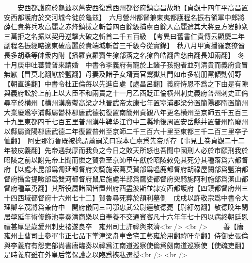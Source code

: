 　　安西都護府於龜兹以舊安西復爲西州都督府鎮高昌故地【貞觀十四年平高昌置安西都護府於交河城今徙於龜兹】　六月營州都督兼東夷都護程名振右領軍中郎將薛仁貴將兵攻高麗之赤烽鎮拔之斬首四百餘級捕虜百餘人高麗遣其大將豆方婁帥衆三萬拒之名振以契丹逆擊大破之斬首二千五百級　【考異曰舊書仁貴傳云顯慶二年副程名振經略遼東破高麗於貴端城斬首三千級今從實錄】　秋八月甲寅播羅哀獠酋長多胡桑等帥衆内附【播羅哀羅竇生獠部落之名獠魯皓翻酋慈由翻長知兩翻】　冬十月庚申吐蕃贊普來請婚　中書令李義府有寵於上諸子孩抱者並列清貴而義府貪冒無厭【冒莫北翻厭於鹽翻】母妻及諸子女壻賣官鬻獄其門如市多樹朋黨傾動朝野【朝直遙翻】中書令杜正倫每以先進自處【處昌呂翻】義府恃恩不爲之下由是有隙與義府訟於上前上以大臣不和兩責之十一月乙酉貶正倫横州刺史義府普州刺史正倫尋卒於横州【横州漢廣鬱高梁之地晉武帝太康七年置寜浦郡梁分置簡陽郡隋置簡州大業廢爲寜浦縣屬鬱林郡唐武德初復置南簡州貞觀八年更名横州至京師五千五百三十九里東都四千七百五里普州漢牛鞞墊江資中三縣地後周置安岳縣并置普州隋廢州以縣屬資陽郡唐武德二年復置普州至京師二千三百六十里至東都三千二百三里卒子恤翻】　阿史那賀魯既被擒謂蕭嗣業曰我本亡虜爲先帝所存【事見上卷貞觀二十二年被皮義翻】先帝遇我厚而我負之今日之敗天所怒也吾聞中國刑人必於市願刑我於昭陵之前以謝先帝上聞而憐之賀魯至京師甲午獻於昭陵敕免其死分其種落爲六都督府【以處木昆部爲匐延都督府突騎施索葛莫賀部爲嗢鹿都督府胡祿屋闕部爲鹽洎都督府攝舍提暾部爲雙河都督府鼠尼施處半部爲鷹娑都督府突騎施阿利施部爲潔山都督府種章勇翻】其所役屬諸國皆置州府西盡波斯並隸安西都護府【四鎮都督府州三十四西域都督府十六州七十二】賀魯尋死葬於頡利墓側　戊戌以許敬宗爲中書令大理卿辛茂將爲兼侍中　開府儀同三司鄂忠武公尉遲敬德薨【尉紆勿翻】敬德晩年閑居學延年術修飾池臺奏清商樂以自奉養不交通賓客凡十六年年七十四以病終朝廷恩禮甚厚是歲愛州刺史禇遂良卒　雍州司士許禕與來濟<br />
<br />
　　善【唐雍州士曹司士參軍事正七品下掌津梁舟車舍宅工藝雍於用翻禕吁韋翻】侍御史張倫與李義府有怨吏部尚書唐臨奏以禕爲江南道巡察使倫爲劒南道巡察使【使疏吏翻】是時義府雖在外皇后常保護之以臨爲挾私選授<br />
<br />
